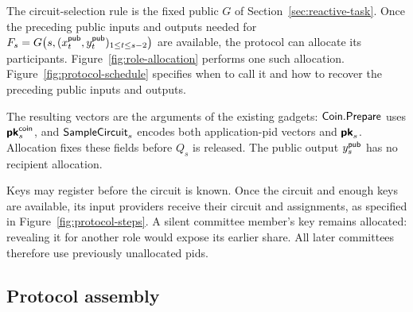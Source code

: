 The circuit-selection rule is the fixed public $G$ of
Section~\ref{sec:reactive-task}.  Once the preceding public inputs and outputs needed
for $F_s=G\bigl(s,(x^{\mathsf{pub}}_t,y^{\mathsf{pub}}_t)_{1\le t\le s-2}\bigr)$ are available, the protocol can
allocate its participants.  Figure~\ref{fig:role-allocation} performs one
such allocation.  Figure~\ref{fig:protocol-schedule} specifies when to
call it and how to recover the preceding public inputs and outputs.

The resulting vectors are the arguments of the existing gadgets:
$\mathsf{Coin}.\mathsf{Prepare}$ uses $\boldsymbol{\mathsf{pk}}^{\mathsf{coin}}_s$, and
$\mathsf{SampleCircuit}_s$ encodes both application-pid vectors and
$\boldsymbol{\mathsf{pk}}_s$.  Allocation fixes these fields before $Q_s$ is
released.  The public output $y^{\mathsf{pub}}_s$ has no recipient allocation.

Keys may register before the circuit is known.  Once the circuit and
enough keys are available, its input providers receive their circuit and
assignments, as specified in
Figure~\ref{fig:protocol-steps}.  A silent committee member's key remains
allocated: revealing it for another role would expose its earlier
share.  All later committees therefore use previously unallocated pids.

\subsection{Protocol assembly}
\label{sec:protocol-assembly}

